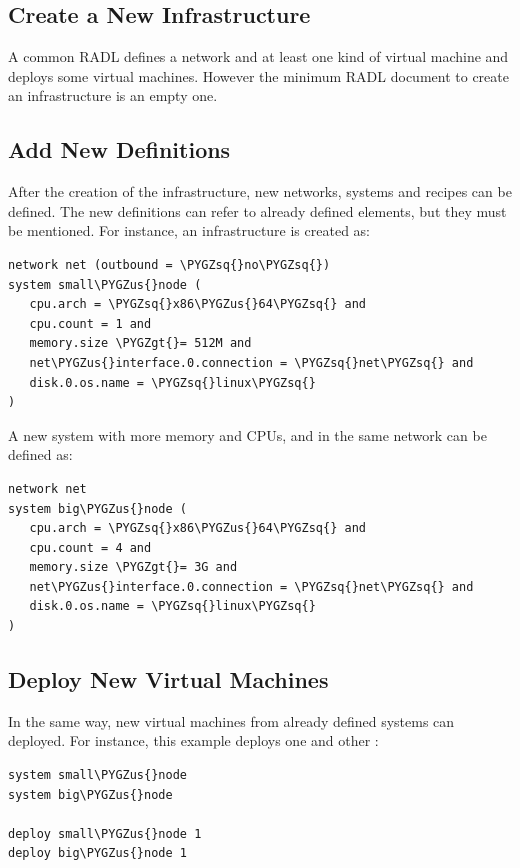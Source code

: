\documentclass[letterpaper,10pt,english]{sphinxmanual}
\def\PYGZus{\char`\_}
\def\PYGZgt{\char`\>}
\def\PYGZsq{\char`\'}
\begin{document}
\subsection{Create a New Infrastructure}
\label{radl:index-1}\label{radl:create-a-new-infrastructure}
A common RADL defines a network and at least one kind of virtual machine and
deploys some virtual machines. However the minimum RADL document to create
an infrastructure is an empty one.


\subsection{Add New Definitions}
\label{radl:add-new-definitions}
After the creation of the infrastructure, new networks, systems and recipes
can be defined. The new definitions can refer to already defined elements,
but they must be mentioned. For instance, an infrastructure is created as:

\begin{Verbatim}[commandchars=\\\{\}]
network net (outbound = \PYGZsq{}no\PYGZsq{})
system small\PYGZus{}node (
   cpu.arch = \PYGZsq{}x86\PYGZus{}64\PYGZsq{} and
   cpu.count = 1 and
   memory.size \PYGZgt{}= 512M and
   net\PYGZus{}interface.0.connection = \PYGZsq{}net\PYGZsq{} and
   disk.0.os.name = \PYGZsq{}linux\PYGZsq{}
)
\end{Verbatim}

A new system with more memory and CPUs, and in the same network can be defined
as:

\begin{Verbatim}[commandchars=\\\{\}]
network net
system big\PYGZus{}node (
   cpu.arch = \PYGZsq{}x86\PYGZus{}64\PYGZsq{} and
   cpu.count = 4 and
   memory.size \PYGZgt{}= 3G and
   net\PYGZus{}interface.0.connection = \PYGZsq{}net\PYGZsq{} and
   disk.0.os.name = \PYGZsq{}linux\PYGZsq{}
)
\end{Verbatim}


\subsection{Deploy New Virtual Machines}
\label{radl:deploy-new-virtual-machines}
In the same way, new virtual machines from already defined systems can deployed.
For instance, this example deploys one  and other :

\begin{Verbatim}[commandchars=\\\{\}]
system small\PYGZus{}node
system big\PYGZus{}node

deploy small\PYGZus{}node 1
deploy big\PYGZus{}node 1
\end{Verbatim}
\end{document}
